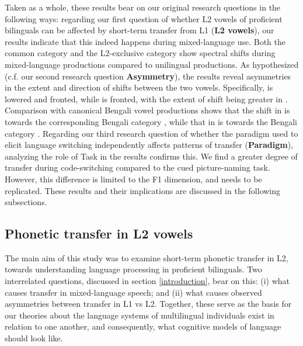 \documentclass[12 pt]{article}
\newcommand{\nt}[1]{\textipa{[#1]}} %
\begin{document}
Taken as a whole, these results bear on our original research questions in the following ways: regarding our first question of whether L2 vowels of proficient bilinguals can be affected by short-term transfer from L1 (\textbf{L2 vowels}), our results indicate that this indeed happens during mixed-language use. Both the common category \nt{\ae} and the L2-exclusive category \nt{2} show spectral shifts during mixed-language productions compared to unilingual productions. As hypothesized (c.f. our second research question \textbf{Asymmetry}), the results reveal asymmetries in the extent and direction of shifts between the two vowels. Specifically, \nt{2} is lowered and fronted, while \nt{\ae} is fronted, with the extent of shift being greater in \nt{2}. Comparison with canonical Bengali vowel productions shows that the shift in \nt{\ae} is towards the corresponding Bengali category \nt{\ae}, while that in \nt{2} is towards the Bengali category \nt{a:}. Regarding our third research question of whether the paradigm used to elicit language switching independently affects patterns of transfer (\textbf{Paradigm}), analyzing the role of Task in the results confirms this. We find a greater degree of transfer during code-switching compared to the cued picture-naming task. However, this difference is limited to the F1 dimension, and needs to be replicated. These results and their implications are discussed in the following subsections.


\subsection{Phonetic transfer in L2 vowels}

The main aim of this study was to examine short-term phonetic transfer in L2, towards understanding language processing in proficient bilinguals. Two interrelated questions, discussed in section \ref{introduction}, bear on this: (i) what causes transfer in mixed-language speech; and (ii) what causes observed asymmetries between transfer in L1 vs L2. Together, these serve as the basis for our theories about the language systems of multilingual individuals exist in relation to one another, and consequently, what cognitive models of language should look like. 
\end{document}
